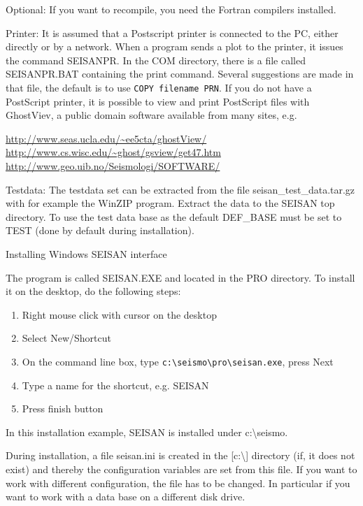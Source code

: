 Optional: If you want to recompile, you need the Fortran compilers installed. 

Printer:\newline
It is assumed that a Postscript printer is connected to the PC, either 
directly or by a network. When a program sends 
a plot to the printer, it issues the command SEISANPR.  
In the COM directory, there is a file called SEISANPR.BAT containing 
the print command. Several suggestions are made in that file, the 
default is to use \texttt{COPY filename PRN}. 
If you do not have a PostScript 
printer, it is possible to view and print PostScript files with 
GhostViev, a public domain software available from many sites, e.g.  

\url{http://www.seas.ucla.edu/~ee5cta/ghostView/}\newline
\url{http://www.cs.wisc.edu/~ghost/gsview/get47.htm}\newline
\url{http://www.geo.uib.no/Seismologi/SOFTWARE/} 

Testdata:\newline
The testdata set can be extracted from the file seisan\_test\_data.tar.gz  with for example the WinZIP program. Extract the data to the SEISAN top directory. To use the test data base as the default DEF\_BASE must be set to TEST (done by default during installation). 

Installing Windows SEISAN interface

The program is called SEISAN.EXE and located in the PRO directory. To install it on the desktop, do the following steps: 

\begin{enumerate}
\item Right mouse click with cursor on the desktop 
\item Select New/Shortcut 
\item On 
the command line box, type 
\texttt{c:\textbackslash seismo\textbackslash pro\textbackslash seisan.exe}, press Next 
\item Type a name for the shortcut, e.g. SEISAN 
\item Press finish button 
\end{enumerate}

In this installation example, SEISAN is installed under c:\textbackslash seismo. 

During installation, a file seisan.ini is created in the [c:\textbackslash ] directory (if, it does not exist) and thereby the configuration variables are set from this file. If you want to work with different configuration, the file has to be changed. In particular if you want to work with a data base on a different disk drive. 

